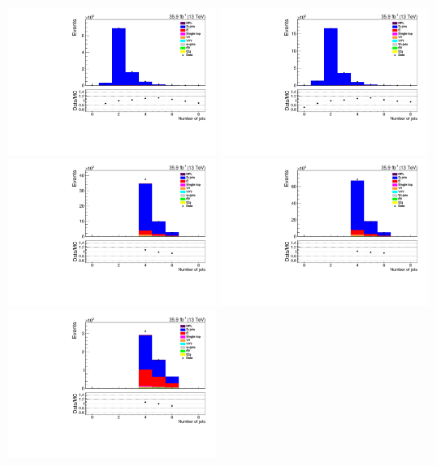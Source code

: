 \begin{figure}[ht]
\centering
\includegraphics[width=0.49\textwidth]{figs/background-estimation/plots/unblinded/prompt_ee_ttbarInc/numbJets_NPL_ee_lepSel_ee.pdf}
\includegraphics[width=0.49\textwidth]{figs/background-estimation/plots/unblinded/prompt_mumu_ttbarInc/numbJets_NPL_mumu_lepSel_mumu.pdf}
\\
\includegraphics[width=0.49\textwidth]{figs/background-estimation/plots/unblinded/prompt_ee_ttbarInc/numbJets_NPL_ee_jetSel_ee.pdf}
\includegraphics[width=0.49\textwidth]{figs/background-estimation/plots/unblinded/prompt_mumu_ttbarInc/numbJets_NPL_mumu_jetSel_mumu.pdf}
\\
\includegraphics[width=0.49\textwidth]{figs/background-estimation/plots/unblinded/prompt_ee_ttbarInc/numbJets_NPL_ee_wMass_ee.pdf}

\end{figure}
